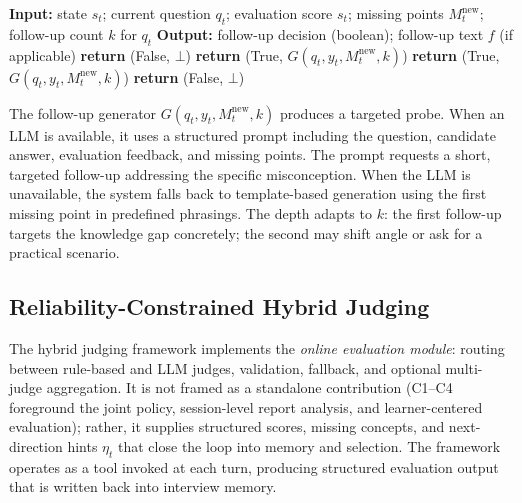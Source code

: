 ﻿\documentclass[final,3p,times,authoryear]{elsarticle}
\begin{document}
\begin{algorithm}[h]
\caption{Follow-up Decision and Generation}
\label{alg:followup}
\begin{algorithmic}[1]
\STATE \textbf{Input:} state $s_t$; current question $q_t$; evaluation score $s_t$; missing points $M_t^{\text{new}}$; follow-up count $k$ for $q_t$
\STATE \textbf{Output:} follow-up decision (boolean); follow-up text $f$ (if applicable)
 \STATE \textbf{return} (False, $\bot$) \ENDIF
{}
    \STATE \textbf{return} (True, $G(q_t, y_t, M_t^{\text{new}}, k)$)
\ENDIF
{}
    \STATE \textbf{return} (True, $G(q_t, y_t, M_t^{\text{new}}, k)$)
\ENDIF
\STATE \textbf{return} (False, $\bot$)
\end{algorithmic}
\end{algorithm}

The follow-up generator $G(q_t, y_t, M_t^{\text{new}}, k)$ produces a targeted probe. When an LLM is available, it uses a structured prompt including the question, candidate answer, evaluation feedback, and missing points. The prompt requests a short, targeted follow-up addressing the specific misconception. When the LLM is unavailable, the system falls back to template-based generation using the first missing point in predefined phrasings. The depth adapts to $k$: the first follow-up targets the knowledge gap concretely; the second may shift angle or ask for a practical scenario.

\subsection{Reliability-Constrained Hybrid Judging}
\label{sec:hybrid_judging}

\noindent The hybrid judging framework implements the \emph{online evaluation module}: routing between rule-based and LLM judges, validation, fallback, and optional multi-judge aggregation. It is not framed as a standalone contribution (C1--C4 foreground the joint policy, session-level report analysis, and learner-centered evaluation); rather, it supplies structured scores, missing concepts, and next-direction hints $\eta_t$ that close the loop into memory and selection. The framework operates as a tool invoked at each turn, producing structured evaluation output that is written back into interview memory.
\end{document}

